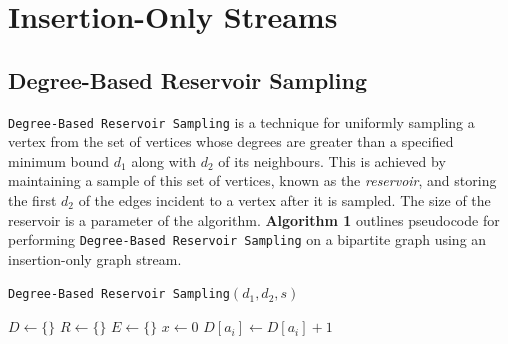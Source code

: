 \documentclass[11pt,twoside,a4paper]{report}
\begin{document}
\chapter{Insertion-Only Streams}

\section{Degree-Based Reservoir Sampling}

\texttt{Degree-Based Reservoir Sampling} is a technique for uniformly sampling a vertex from the set of vertices whose degrees are greater than a specified minimum bound $d_1$ along with $d_2$ of its neighbours. This is achieved by maintaining a sample of this set of vertices, known as the \textit{reservoir}, and storing the first $d_2$ of the edges incident to a vertex after it is sampled. The size of the reservoir is a parameter of the algorithm. \textbf{Algorithm 1} outlines pseudocode for performing \texttt{Degree-Based Reservoir Sampling} on a bipartite graph using an insertion-only graph stream.

\begin{algorithm}
	\caption{\texttt{Degree-Based Reservoir Sampling}$(d_1,d_2,s)$}
	$D\leftarrow\{\}$ 
	$R\leftarrow\{\}$ 
	$E\leftarrow\{\}$ 
	$x\leftarrow0$
	 {
		$D[a_i]\leftarrow D[a_i]+1$
	}
	 {
	} 
\end{algorithm}
\end{document}
